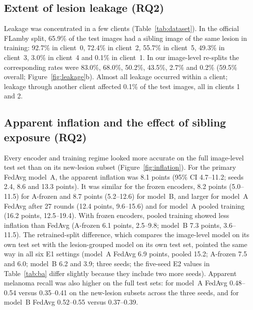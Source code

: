 \documentclass[VANCOUVER,Times1COL]{WileyNJDv5}
\begin{document}
\subsection{Extent of lesion leakage (RQ2)}
\label{sec:res-extent}

Leakage was concentrated in a few clients (Table~\ref{tab:dataset}). In the official FLamby split, 65.9\%
of the test images had a sibling image of the same lesion in training: 92.7\% in client~0, 72.4\% in
client~2, 55.7\% in client~5, 49.3\% in client~3, 3.0\% in client~4 and 0.1\% in client~1. In our
image-level re-splits the corresponding rates were 83.0\%, 68.0\%, 50.2\%, 43.5\%, 2.7\% and 0.2\%
(59.5\% overall; Figure~\ref{fig:leakage}b). Almost all leakage occurred within a client; leakage through
another client affected 0.1\% of the test images, all in clients 1 and 2.

\subsection{Apparent inflation and the effect of sibling exposure (RQ2)}
\label{sec:res-leakage}

Every encoder and training regime looked more accurate on the full image-level test set than on its
new-lesion subset (Figure~\ref{fig:inflation}). For the primary FedAvg model~A, the apparent inflation was
8.1 points (95\% CI 4.7--11.2; seeds 2.4, 8.6 and 13.3 points). It was similar for the frozen encoders,
8.2 points (5.0--11.5) for A-frozen and 8.7 points (5.2--12.6) for model~B, and larger for model~A FedAvg
after 27 rounds (12.4 points, 9.6--15.6) and for model~A pooled training (16.2 points, 12.5--19.4). With
frozen encoders, pooled training showed less inflation than FedAvg (A-frozen 6.1 points, 2.5--9.8;
model~B 7.3 points, 3.6--11.5). The retrained-split difference, which compares the image-level model on
its own test set with the lesion-grouped model on its own test set, pointed the same way in all six
E1 settings (model~A FedAvg 6.9 points, pooled 15.2; A-frozen 7.5 and 6.0; model~B 6.2 and 3.9; three
seeds; the five-seed E2 values in Table~\ref{tab:ba} differ slightly because they include two more
seeds). Apparent melanoma recall was also higher on the full test sets: for model~A FedAvg 0.48--0.54
versus 0.35--0.41 on the new-lesion subsets across the three seeds, and for model~B FedAvg 0.52--0.55
versus 0.37--0.39.
\end{document}
